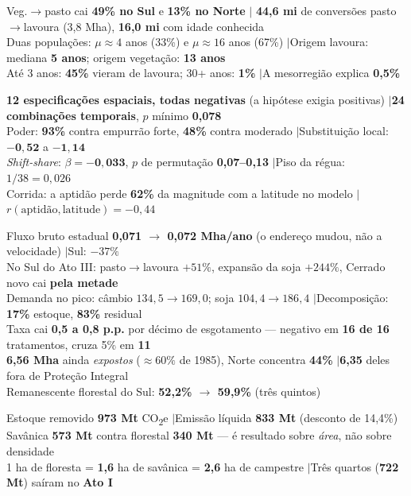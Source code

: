 Veg.$\to$pasto cai \textbf{49\% no Sul} e \textbf{13\% no Norte} \quad$|$\quad
\textbf{44,6 mi} de conversões pasto$\to$lavoura (3,8 Mha), \textbf{16,0 mi} com
idade conhecida \\
Duas populações: $\mu \approx 4$ anos (33\%) e $\mu \approx 16$ anos (67\%)
\quad$|$\quad Origem lavoura: mediana \textbf{5 anos}; origem vegetação:
\textbf{13 anos} \\
Até 3 anos: \textbf{45\%} vieram de lavoura; 30+ anos: \textbf{1\%}
\quad$|$\quad A mesorregião explica \textbf{0,5\%}

\textbf{12 especificações espaciais, todas negativas} (a hipótese exigia
positivas) \quad$|$\quad \textbf{24 combinações temporais}, $p$ mínimo
\textbf{0,078} \\
Poder: \textbf{93\%} contra empurrão forte, \textbf{48\%} contra moderado
\quad$|$\quad Substituição local: $\mathbf{-0{,}52}$ a $\mathbf{-1{,}14}$ \\
\emph{Shift-share}: $\beta = \mathbf{-0{,}033}$, $p$ de permutação
\textbf{0,07--0,13} \quad$|$\quad Piso da régua: $1/38 = 0{,}026$ \\
Corrida: a aptidão perde \textbf{62\%} da magnitude com a latitude no modelo
\quad$|$\quad $r(\text{aptidão}, \text{latitude}) = -0{,}44$

Fluxo bruto estadual \textbf{0,071 $\to$ 0,072 Mha/ano} (o endereço mudou, não a
velocidade) \quad$|$\quad Sul: $-37\%$ \\
No Sul do Ato III: pasto$\to$lavoura \textbf{$+51\%$}, expansão da soja
\textbf{$+244\%$}, Cerrado novo cai \textbf{pela metade} \\
Demanda no pico: câmbio $134{,}5 \to 169{,}0$; soja $104{,}4 \to 186{,}4$
\quad$|$\quad Decomposição: \textbf{17\%} estoque, \textbf{83\%} residual \\
Taxa cai \textbf{0,5 a 0,8 p.p.} por décimo de esgotamento --- negativo em
\textbf{16 de 16} tratamentos, cruza 5\% em \textbf{11} \\
\textbf{6,56 Mha} ainda \emph{expostos} ($\approx 60\%$ de 1985), Norte concentra
\textbf{44\%} \quad$|$\quad \textbf{6,35} deles fora de Proteção Integral \\
Remanescente florestal do Sul: \textbf{52,2\% $\to$ 59,9\%} (três quintos)

Estoque removido \textbf{973 Mt} CO\textsubscript{2}e \quad$|$\quad Emissão
líquida \textbf{833 Mt} (desconto de 14,4\%) \\
Savânica \textbf{573 Mt} contra florestal \textbf{340 Mt} --- é resultado sobre
\emph{área}, não sobre densidade \\
1 ha de floresta = \textbf{1,6} ha de savânica = \textbf{2,6} ha de campestre
\quad$|$\quad Três quartos (\textbf{722 Mt}) saíram no \textbf{Ato I}

